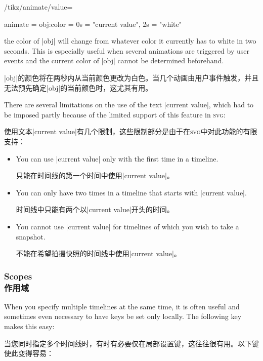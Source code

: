 \begin{key}{/tikz/animate/value=}
\begin{codeexample}
animate = { obj:color = { 0s = "current value", 2s = "white" } }
\end{codeexample}
    the color of |obj| will change from whatever color it currently has to
    white in two seconds. This is especially useful when several animations are
    triggered by user events and the current color of |obj| cannot be
    determined beforehand.

    |obj|的颜色将在两秒内从当前颜色更改为白色。当几个动画由用户事件触发，并且无法预先确定|obj|的当前颜色时，这尤其有用。

    There are several limitations on the use of the text |current value|, which
    had to be imposed partly because of the limited support of this feature in
    \textsc{svg}:
    
    使用文本|current value|有几个限制，这些限制部分是由于在\textsc{svg}中对此功能的有限支持：


    \begin{itemize}
        \item You can use |current value| only with the first time in a
            timeline.

            只能在时间线的第一个时间中使用|current value|。


        \item You can only have two times in a timeline that starts with
            |current value|.

            时间线中只能有两个以|current value|开头的时间。


        \item You cannot use |current value| for timelines of which you wish to
            take a snapshot.

            不能在希望拍摄快照的时间线中使用|current value|。
    \end{itemize}
\end{key}


\subsubsection{Scopes\\作用域}
\label{section-anim-scopes}

When you specify multiple timelines at the same time, it is often useful and
sometimes even necessary to have keys be set only locally. The following key
makes this easy:

当您同时指定多个时间线时，有时有必要仅在局部设置键，这往往很有用。以下键使此变得容易：

